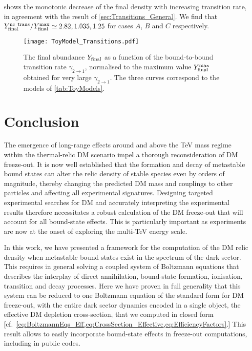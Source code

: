 \documentclass[preprint,5p,twocolumn]{elsarticle}
\begin{document}
 shows the monotonic decrease of the final density with increasing transition rate, in agreement with the result of \cref{sec:Transitions_General}. We find that $Y_{\rm final}^{\rm no~trans} / Y_{\rm final}^{\rm max} \simeq 2.82, 1.035, 1.25$ for cases $A$, $B$ and $C$ respectively.
%
\begin{figure}[h!]
\centering
\texttt{[image: ToyModel\_Transitions.pdf]}
\caption{
The final abundance $Y_{\rm final}$ as a function of the bound-to-bound transition rate $\gamma_{2\to1}$, normalised to the maximum value $Y_{\rm final}^{\rm max}$ obtained for very large $\gamma_{2\to1}$. The three curves correspond to the models of \cref{tab:ToyModels}.}
\label{fig:ToyModel_Transitions}
\end{figure}


\section{Conclusion \label{Sec:Concl}}

The emergence of long-range effects around and above the TeV mass regime within the thermal-relic DM scenario impel a thorough reconsideration of DM freeze-out. It is now well established that the formation and decay of metastable bound states can alter the relic density of stable species even by orders of magnitude, thereby changing the predicted DM mass and couplings to other particles and affecting all experimental signatures. Designing targeted experimental searches for DM and accurately interpreting the experimental results therefore necessitates a robust calculation of the DM freeze-out that will account for all bound-state effects. This is particularly important as experiments are now at the onset of exploring the multi-TeV energy scale.

In this work, we have presented a framework for the computation of the DM relic density when metastable bound states exist in the spectrum of the dark sector. 
This requires in general solving a coupled system of Boltzmann equations that describes the interplay of direct annihilation, bound-state formation, ionisation, transition and decay processes. Here we have proven in full generality that this system can be reduced to one Boltzmann equation of the standard form for DM freeze-out, with the entire dark sector dynamics encoded in a single object, the effective DM depletion cross-section, that we computed in closed form [cf.~\cref{eq:BoltzmannEqs_Eff,eq:CrossSection_Effective,eq:EfficiencyFactors}.]
This result allows to easily incorporate bound-state effects in freeze-out computations, including in public codes. 
\end{document}
